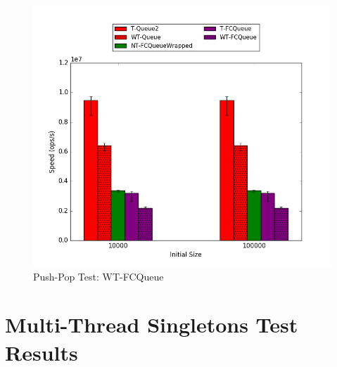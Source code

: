 \begin{figure}[H]
    \centering
	\begin{minipage}{0.45\textwidth}
    \includegraphics[width=\textwidth]{fcqueues/lpQ:PushPop.png}
	\end{minipage}
	\begin{minipage}{0.45\textwidth}
    
	\end{minipage}
    \caption{Push-Pop Test: WT-FCQueue}
    \label{fig:wtqs_pushpop}
\end{figure}

\section{Multi-Thread Singletons Test Results}

